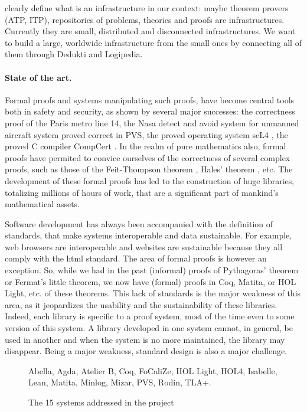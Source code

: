 {\color{red}
clearly define what is an
infrastructure in our context: maybe theorem provers (ATP, ITP),
repositories of problems, theories and proofs are infrastructures.
Currently they are small, distributed and disconnected
infrastructures.  We want to build a large, worldwide infrastructure
from the small ones by connecting all of them through Dedukti and
Logipedia.
}

\paragraph{State of the art.}
Formal proofs and systems manipulating such proofs, have become
central tools both in safety and security, as shown by several major
successes: the correctness proof of the Paris metro line 14, the Nasa
detect and avoid system for unmanned aircraft system proved correct in
PVS, the proved operating system seL4 \cite{Klein09}, the proved C
compiler CompCert \cite{Leroy06}.  In the realm of pure mathematics
also, formal proofs have permited to convice ourselves of the
correctness of several complex proofs, such as those of the Feit-Thompson
theorem \cite{Gonthier13}, Hales' theorem
\cite{Hales17}, etc.  The development of these formal proofs has led
to the construction of huge libraries, totalizing millions of hours of
work, that are a significant part of mankind's mathematical assets.

Software development has always been accompanied with the definition
of standards, that make systems interoperable and data
sustainable. For example, web browsers are interoperable and websites
are sustainable because they all comply with the html standard. The
area of formal proofs is however an exception. So, while we had in the
past (informal) proofs of Pythagoras' theorem or Fermat's little
theorem, we now have (formal) proofs in {\sc Coq}, {\sc Matita}, or
{\sc HOL Light}, etc. of these theorems. This lack of standards is
the major weakness of this area, as it jeopardizes the usability and
the sustainability of these libraries. Indeed, each library is
specific to a proof system, most of the time even to some version of
this system. A library developed in one system cannot, in general, be
used in another and when the system is no more maintained, the library
may disappear. Being a major weakness, standard design is also a major
challenge.

\begin{figure}
{\sc Abella}, 
{\sc Agda}, 
{\sc Atelier B}, 
{\sc Coq}, 
{\sc FoCaliZe}, 
{\sc HOL Light}, 
{\sc HOL4},
{\sc Isabelle},
{\sc Lean}, 
{\sc Matita}, 
{\sc Minlog}, 
{\sc Mizar}, 
{\sc PVS}, 
{\sc Rodin}, 
{\sc TLA+}.
\caption{The 15 systems addressed in the project}
\end{figure}

